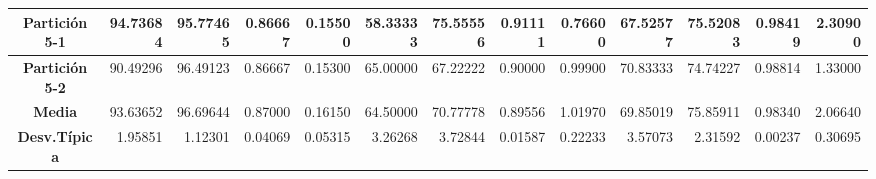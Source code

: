 \documentclass[a4paper,11pt]{article}
\begin{document}
\begin{table}[H]
\begin{adjustbox}{width=1.1\textwidth}
\begin{tabular}{|c|r|r|r|r|r|r|r|r|r|r|r|r|}
  \textbf{Partición 5-1} & 94.73684 & 95.77465 & 0.86667 & 0.15500 & 58.33333 & 75.55556 & 0.91111 & 0.76600 & 67.52577 & 75.52083 & 0.98419 & 2.30900 \\ \hline
  \textbf{Partición 5-2} & 90.49296 & 96.49123 & 0.86667 & 0.15300 & 65.00000 & 67.22222 & 0.90000 & 0.99900 & 70.83333 & 74.74227 & 0.98814 & 1.33000 \\ \hline
  \textbf{Media} & 93.63652 & 96.69644 & 0.87000 & 0.16150 & 64.50000 & 70.77778 & 0.89556 & 1.01970 & 69.85019 & 75.85911 & 0.98340 & 2.06640 \\ \hline
  \textbf{Desv.Típica} & 1.95851 & 1.12301 & 0.04069 & 0.05315 & 3.26268 & 3.72844 & 0.01587 & 0.22233 & 3.57073 & 2.31592 & 0.00237 & 0.30695 \\ \hline
  \end{tabular}
  \end{adjustbox}
  \label{SFS}
  \end{table}
  
\end{document}
